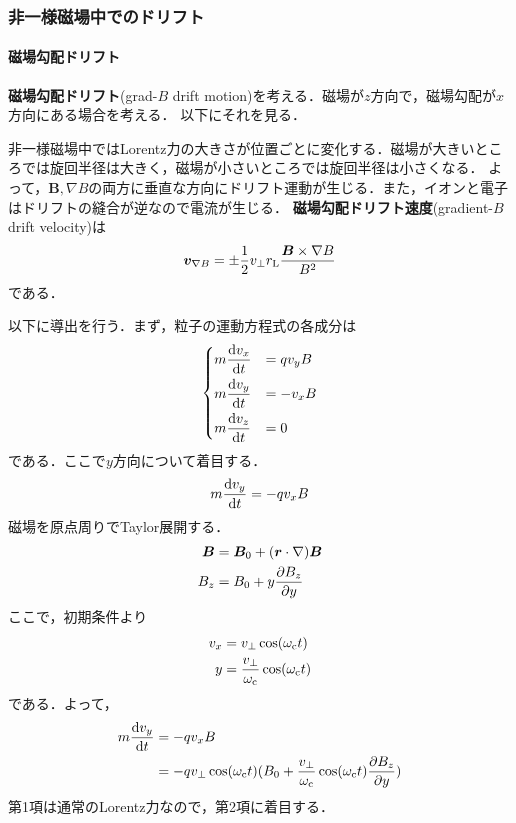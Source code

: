 \documentclass{report}
\begin{document}
      \subsubsection{非一様磁場中でのドリフト}
        \paragraph{磁場勾配ドリフト}
          \textbf{磁場勾配ドリフト}(grad-$B$ drift motion)を考える．磁場が$z$方向で，磁場勾配が$x$方向にある場合を考える．
          以下にそれを見る．

          非一様磁場中ではLorentz力の大きさが位置ごとに変化する．磁場が大きいところでは旋回半径は大きく，磁場が小さいところでは旋回半径は小さくなる．
          よって，$\bm{B},\nabla B$の両方に垂直な方向にドリフト運動が生じる．また，イオンと電子はドリフトの縫合が逆なので電流が生じる．
          \textbf{磁場勾配ドリフト速度}(gradient-$B$ drift velocity)は
          \begin{align}
            \bm{v}_{\nabla B} = \pm \frac{1}{2} v_{\perp} r_{\mathrm{L}} \frac{\bm{B} \times \nabla B}{B^2}
          \end{align}
          である．

          以下に導出を行う．まず，粒子の運動方程式の各成分は
          \begin{align}
            \begin{dcases}
              m \dv{v_x}{t} &= qv_yB\\
              m \dv{v_y}{t} &= - v_xB\\
              m \dv{v_z}{t} &= 0
            \end{dcases}
          \end{align}
          である．ここで$y$方向について着目する．
          \begin{align}
            m \dv{v_y}{t} = -q v_x B
          \end{align}
          磁場を原点周りでTaylor展開する．
          \begin{align}
            \bm{B} &= \bm{B}_0 + (\bm{r} \cdot \nabla)\bm{B}\\
            B_z &= B_0 + y\pdv{B_z}{y}
          \end{align}
          ここで，初期条件より
          \begin{align}
            v_x &= v_{\perp} \cos(\omega_{\mathrm{c}}t)\\
            y &= \frac{v_{\perp}}{\omega_{\mathrm{c}}}\cos(\omega_{\mathrm{c}}t)
          \end{align}
          である．よって，
          \begin{align}
            m \dv{v_y}{t} &= -qv_x B\\
            &=  -q v_{\perp} \cos(\omega_{\mathrm{c}}t) (B_0 + \frac{v_{\perp}}{\omega_{\mathrm{c}}}\cos(\omega_{\mathrm{c}}t)\pdv{B_z}{y})\\
          \end{align}
          第1項は通常のLorentz力なので，第2項に着目する．
\end{document}
